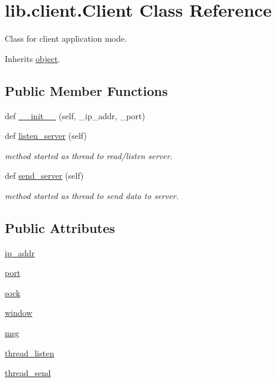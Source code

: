 \hypertarget{classlib_1_1client_1_1_client}{}\section{lib.\+client.\+Client Class Reference}
\label{classlib_1_1client_1_1_client}


Class for client application mode.  




Inherits \hyperlink{classobject}{object}.

\subsection*{Public Member Functions}
\begin{DoxyCompactItemize}
\item 
def \hyperlink{classlib_1_1client_1_1_client_a942b92a076c34955c94d1571c574f00d}{\+\_\+\+\_\+init\+\_\+\+\_\+} (self, \+\_\+ip\+\_\+addr, \+\_\+port)
\item 
def \hyperlink{classlib_1_1client_1_1_client_ae7cf3bdafab9eec4a5a21e7bd234c17b}{listen\+\_\+server} (self)
\begin{DoxyCompactList}\small\item\em method started as thread to read/listen server. \end{DoxyCompactList}\item 
def \hyperlink{classlib_1_1client_1_1_client_a1100c4e3f2e08d6c48ab4f375b079aa4}{send\+\_\+server} (self)
\begin{DoxyCompactList}\small\item\em method started as thread to send data to server. \end{DoxyCompactList}\end{DoxyCompactItemize}
\subsection*{Public Attributes}
\begin{DoxyCompactItemize}
\item 
\hyperlink{classlib_1_1client_1_1_client_a14e1fa287605a688760e57f2a0232d2a}{ip\+\_\+addr}
\item 
\hyperlink{classlib_1_1client_1_1_client_a35b672da8f23ae7aeadc3e03e99f9edd}{port}
\item 
\hyperlink{classlib_1_1client_1_1_client_a79510d74a099f685a18c07b4e22116fa}{sock}
\item 
\hyperlink{classlib_1_1client_1_1_client_ab61a588e77b65d111685863ed9be01d9}{window}
\item 
\hyperlink{classlib_1_1client_1_1_client_a60b77e8b0ae291e08817017df40a90cf}{msg}
\item 
\hyperlink{classlib_1_1client_1_1_client_a3464ac167fca93dadccabb3ac5784445}{thread\+\_\+listen}
\item 
\hyperlink{classlib_1_1client_1_1_client_ad877f8666b5123a6b388e32dfde1e35a}{thread\+\_\+send}
\end{DoxyCompactItemize}


